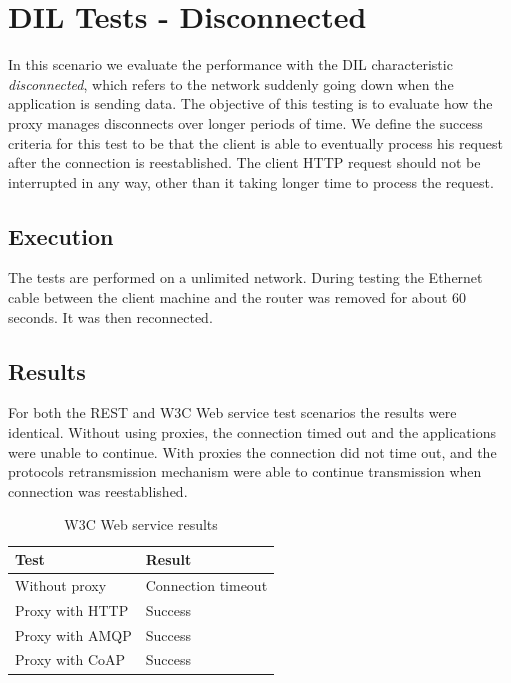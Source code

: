 \section{DIL Tests - Disconnected}

In this scenario we evaluate  the performance with the DIL characteristic
\textit{disconnected}, which refers to the network suddenly going down when the
application is sending data. The objective of this testing is to evaluate how
the proxy manages disconnects over longer periods of time. We define the success
criteria for this test to be that the client is able to eventually process his
request after the connection is reestablished. The client HTTP request should
not be interrupted in any way, other than it taking longer time to process the
request.

\subsection{Execution}

 The tests are performed on a unlimited network. During testing the Ethernet
 cable between the client machine and the router was removed for about 60
 seconds. It was then reconnected.

\subsection{Results}

For both the REST and W3C Web service test scenarios the results were identical.
Without using proxies, the connection timed out and the applications were unable
to continue. With proxies the connection did not time out, and the protocols
retransmission mechanism were able to continue transmission when connection was
reestablished.

\begin{table}[h!]
\begin{tabular}{| l | l |}
\hline
  \textbf{Test} & \textbf{Result} \\ \hline
  Without proxy & Connection timeout \\ \hline
  Proxy with HTTP & Success \\ \hline
  Proxy with AMQP & Success \\ \hline
  Proxy with CoAP & Success \\ \hline
\end{tabular}
\caption{W3C Web service results}
\end{table}

